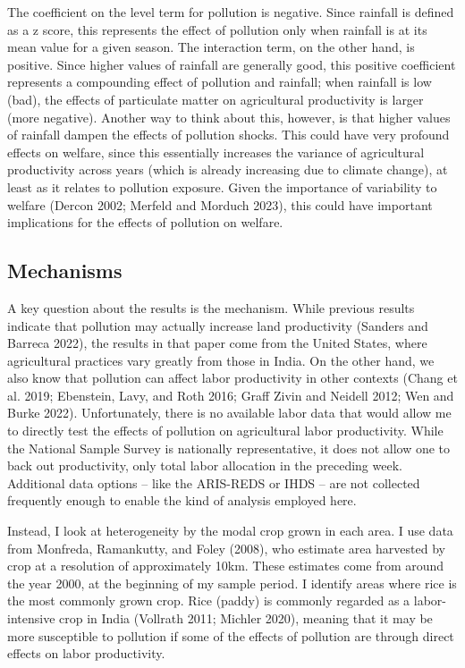 \documentclass[
]{article}
\begin{document}
The coefficient on the level term for pollution is negative. Since rainfall is defined as a z score, this represents the effect of pollution only when rainfall is at its mean value for a given season. The interaction term, on the other hand, is positive. Since higher values of rainfall are generally good, this positive coefficient represents a compounding effect of pollution and rainfall; when rainfall is low (bad), the effects of particulate matter on agricultural productivity is larger (more negative). Another way to think about this, however, is that higher values of rainfall dampen the effects of pollution shocks. This could have very profound effects on welfare, since this essentially increases the variance of agricultural productivity across years (which is already increasing due to climate change), at least as it relates to pollution exposure. Given the importance of variability to welfare (Dercon 2002; Merfeld and Morduch 2023), this could have important implications for the effects of pollution on welfare.

\hypertarget{mechanisms}{%
\subsection{Mechanisms}\label{mechanisms}}

A key question about the results is the mechanism. While previous results indicate that pollution may actually increase land productivity (Sanders and Barreca 2022), the results in that paper come from the United States, where agricultural practices vary greatly from those in India. On the other hand, we also know that pollution can affect labor productivity in other contexts (Chang et al. 2019; Ebenstein, Lavy, and Roth 2016; Graff Zivin and Neidell 2012; Wen and Burke 2022). Unfortunately, there is no available labor data that would allow me to directly test the effects of pollution on agricultural labor productivity. While the National Sample Survey is nationally representative, it does not allow one to back out productivity, only total labor allocation in the preceding week. Additional data options -- like the ARIS-REDS or IHDS -- are not collected frequently enough to enable the kind of analysis employed here.

Instead, I look at heterogeneity by the modal crop grown in each area. I use data from Monfreda, Ramankutty, and Foley (2008), who estimate area harvested by crop at a resolution of approximately 10km. These estimates come from around the year 2000, at the beginning of my sample period. I identify areas where rice is the most commonly grown crop. Rice (paddy) is commonly regarded as a labor-intensive crop in India (Vollrath 2011; Michler 2020), meaning that it may be more susceptible to pollution if some of the effects of pollution are through direct effects on labor productivity.
\end{document}
